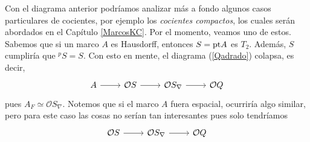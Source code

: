 Con el diagrama anterior podríamos analizar más a fondo algunos casos particulares de cocientes, por ejemplo los \emph{cocientes compactos}, los cuales serán abordados en el Capítulo \ref{MarcosKC}. Por el momento, 
veamos uno de estos. Sabemos que si un marco $A$ es Hausdorff, entonces $S=\mathrm{pt} A$ es $T_2$. Además, $S$ cumpliría que 
$^pS=S$. Con esto en mente, el diagrama (\ref{Qadrado}) colapsa, es decir,
\[\begin{tikzcd}
	A & {\mathcal{O}S} & {\mathcal{O}S_\nabla} & {\mathcal{O}Q}
	\arrow[from=1-1, to=1-2]
	\arrow[from=1-2, to=1-3]
	\arrow[from=1-3, to=1-4]
\end{tikzcd}\]
pues $A_F\simeq \mathcal{O}S_\nabla$. Notemos que si el marco $A$ fuera espacial, ocurriría algo similar, pero para este caso 
las cosas no serían tan interesantes pues solo tendríamos 
\[\begin{tikzcd}
	{\mathcal{O}S} & {\mathcal{O}S_\nabla} & {\mathcal{O}Q}
	\arrow[from=1-1, to=1-2]
	\arrow[from=1-2, to=1-3]
\end{tikzcd}\]
